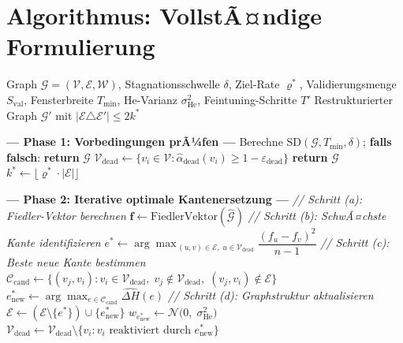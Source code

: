 ﻿\documentclass[12pt, a4paper, openany]{report}
\newcommand{\calG}{\mathcal{G}}
\newcommand{\calN}{\mathcal{N}}
\newcommand{\calV}{\mathcal{V}}
\newcommand{\calE}{\mathcal{E}}
\newcommand{\calW}{\mathcal{W}}
\newcommand{\calC}{\mathcal{C}}
\newcommand{\eps}{\varepsilon}
\begin{document}
\section{Algorithmus: VollstÃ¤ndige Formulierung}
\label{sec:algo_full}

\begin{algorithm}[H]
\caption{Optimale minimale Graphrestrukturierung (OMGR)}
\label{alg:omgr}
\begin{algorithmic}[1]
\Require Graph $\calG = (\calV, \calE, \calW)$, Stagnationsschwelle $\delta$,
         Ziel-Rate $\varrho^*$, Validierungsmenge $S_{\mathrm{val}}$,
         Fensterbreite $T_{\min}$, He-Varianz $\sigma^2_{\mathrm{He}}$,
         Feintuning-Schritte $T'$
\Ensure Restrukturierter Graph $\calG'$ mit
        $|\calE \triangle \calE'| \leq 2k^*$

\Statex \textbf{--- Phase 1: Vorbedingungen prÃ¼fen ---}
\State Berechne $\mathrm{SD}(\calG, T_{\min}, \delta)$;
       \textbf{falls falsch}: \textbf{return} $\calG$ 
\State $\calV_{\mathrm{dead}} \leftarrow
       \{v_i \in \calV : \hat{\alpha}_{\mathrm{dead}}(v_i) \geq 1 - \eps_{\mathrm{dead}}\}$
\If{$\calV_{\mathrm{dead}} = \emptyset$}
  \State \textbf{return} $\calG$
\EndIf
\State $k^* \leftarrow \lfloor \varrho^* \cdot |\calE| \rfloor$

\Statex \textbf{--- Phase 2: Iterative optimale Kantenersetzung ---}
  \State \textit{// Schritt (a): Fiedler-Vektor berechnen}
  \State $\bm{f} \leftarrow \mathrm{FiedlerVektor}(\hat{\calG})$
  \State \textit{// Schritt (b): SchwÃ¤chste Kante identifizieren}
  \State $e^* \leftarrow \arg\max_{\,(u,v) \in \calE,\; u \in \calV_{\mathrm{dead}}}
         \dfrac{(f_u - f_v)^2}{n - 1}$
  \State \textit{// Schritt (c): Beste neue Kante bestimmen}
  \State $\calC_{\mathrm{cand}} \leftarrow
         \{(v_j, v_i) : v_i \in \calV_{\mathrm{dead}},\; v_j \notin \calV_{\mathrm{dead}},\;
           (v_j, v_i) \notin \calE\}$
  \State $e_{\mathrm{new}}^* \leftarrow \arg\max_{e \in \calC_{\mathrm{cand}}}
         \widehat{\Delta H}(e)$
  \State \textit{// Schritt (d): Graphstruktur aktualisieren}
  \State $\calE \leftarrow (\calE \setminus \{e^*\}) \cup \{e_{\mathrm{new}}^*\}$
  \State $w_{e_{\mathrm{new}}^*} \leftarrow \calN\!\bigl(0,\; \sigma^2_{\mathrm{He}}\bigr)$
  \State $\calV_{\mathrm{dead}} \leftarrow
         \calV_{\mathrm{dead}} \setminus \{v_i : v_i \text{ reaktiviert durch } e_{\mathrm{new}}^*\}$
\EndFor


\end{algorithmic}
\end{algorithm}
\end{document}
